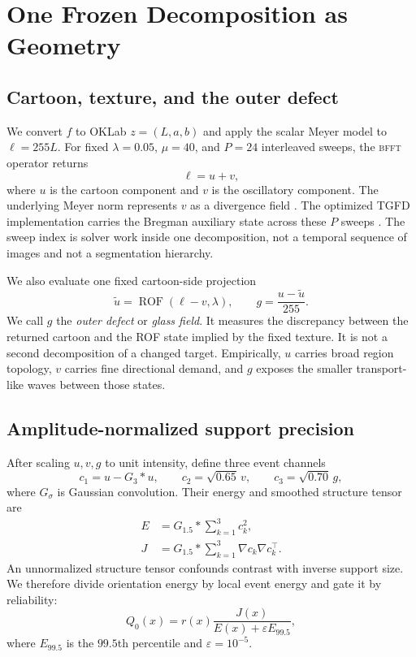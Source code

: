 \documentclass[11pt,letterpaper]{article}
\newcommand{\ROF}{\operatorname{ROF}}
\newcommand{\BFFT}{\textsc{bfft}}
\begin{document}
\section{One Frozen Decomposition as Geometry}
\label{sec:geometry}

\subsection{Cartoon, texture, and the outer defect}

We convert \(f\) to OKLab \(z=(L,a,b)\) and apply the scalar Meyer model to
\(\ell=255L\). For fixed \(\lambda=0.05\), \(\mu=40\), and \(P=24\) interleaved
sweeps, the \BFFT{} operator returns
\begin{equation}
\ell = u+v,
\end{equation}
where \(u\) is the cartoon component and \(v\) is the oscillatory component. The
underlying Meyer norm represents \(v\) as a divergence field
\citep{meyer2001oscillating}. The optimized TGFD implementation carries the Bregman
auxiliary state across these \(P\) sweeps \citep{rainstar2026tgfd}. The sweep index is
solver work inside one decomposition, not a temporal sequence of images and not a
segmentation hierarchy.

We also evaluate one fixed cartoon-side projection
\begin{equation}
\tilde u=\ROF(\ell-v,\lambda),\qquad
g=\frac{u-\tilde u}{255}.
\label{eq:glass}
\end{equation}
We call \(g\) the \emph{outer defect} or \emph{glass field}. It measures the discrepancy
between the returned cartoon and the ROF state implied by the fixed texture. It is not a
second decomposition of a changed target. Empirically, \(u\) carries broad region
topology, \(v\) carries fine directional demand, and \(g\) exposes the smaller
transport-like waves between those states.

\subsection{Amplitude-normalized support precision}

After scaling \(u,v,g\) to unit intensity, define three event channels
\begin{equation}
c_1=u-G_3*u,\qquad
c_2=\sqrt{0.65}\,v,\qquad
c_3=\sqrt{0.70}\,g,
\end{equation}
where \(G_\sigma\) is Gaussian convolution. Their energy and smoothed structure tensor
are
\begin{align}
E &= G_{1.5}*\sum_{k=1}^{3} c_k^2, \\
J &= G_{1.5}*\sum_{k=1}^{3} \nabla c_k\nabla c_k^\top.
\end{align}
An unnormalized structure tensor confounds contrast with inverse support size. We
therefore divide orientation energy by local event energy and gate it by reliability:
\begin{equation}
Q_0(x)=r(x)\frac{J(x)}{E(x)+\varepsilon E_{99.5}},
\label{eq:precision}
\end{equation}
where \(E_{99.5}\) is the \(99.5\)th percentile and \(\varepsilon=10^{-5}\).
\end{document}
